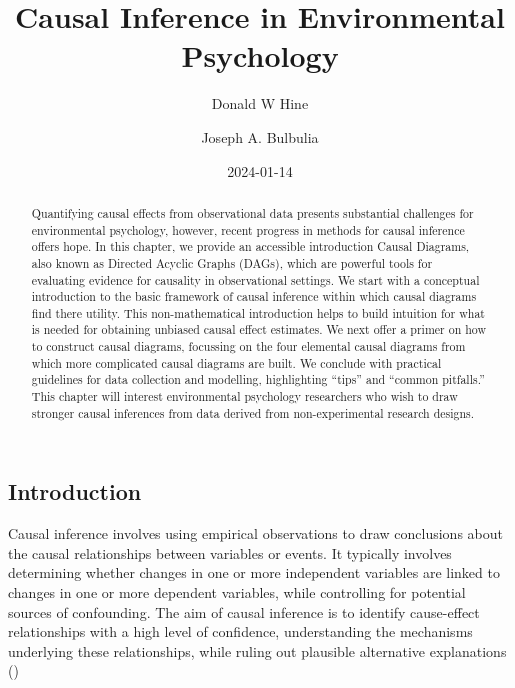 \documentclass[
  singlecolumn]{article}
\title{Causal Inference in Environmental Psychology}
\author{Donald W Hine \and Joseph A. Bulbulia}
\date{2024-01-14}
\begin{document}
\maketitle
\begin{abstract}
Quantifying causal effects from observational data presents substantial
challenges for environmental psychology, however, recent progress in
methods for causal inference offers hope. In this chapter, we provide an
accessible introduction Causal Diagrams, also known as Directed Acyclic
Graphs (DAGs), which are powerful tools for evaluating evidence for
causality in observational settings. We start with a conceptual
introduction to the basic framework of causal inference within which
causal diagrams find there utility. This non-mathematical introduction
helps to build intuition for what is needed for obtaining unbiased
causal effect estimates. We next offer a primer on how to construct
causal diagrams, focussing on the four elemental causal diagrams from
which more complicated causal diagrams are built. We conclude with
practical guidelines for data collection and modelling, highlighting
``tips'' and ``common pitfalls.'' This chapter will interest
environmental psychology researchers who wish to draw stronger causal
inferences from data derived from non-experimental research designs.
\end{abstract}

\subsection{Introduction}\label{introduction}

Causal inference involves using empirical observations to draw
conclusions about the causal relationships between variables or events.
It typically involves determining whether changes in one or more
independent variables are linked to changes in one or more dependent
variables, while controlling for potential sources of confounding. The
aim of causal inference is to identify cause-effect relationships with a
high level of confidence, understanding the mechanisms underlying these
relationships, while ruling out plausible alternative explanations
()
\end{document}
